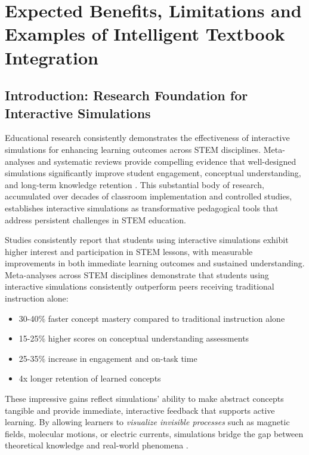 \section{Expected Benefits, Limitations and Examples of Intelligent Textbook Integration}
\label{sec:benefits}
\label{sec:limitations}

\subsection{Introduction: Research Foundation for Interactive Simulations}

Educational research consistently demonstrates the effectiveness of interactive simulations for enhancing learning outcomes across STEM disciplines. Meta-analyses and systematic reviews provide compelling evidence that well-designed simulations significantly improve student engagement, conceptual understanding, and long-term knowledge retention \cite{wieman2008phet, rutten2012learning, dangelo2014simulations}. This substantial body of research, accumulated over decades of classroom implementation and controlled studies, establishes interactive simulations as transformative pedagogical tools that address persistent challenges in STEM education.

Studies consistently report that students using interactive simulations exhibit higher interest and participation in STEM lessons, with measurable improvements in both immediate learning outcomes and sustained understanding. Meta-analyses across STEM disciplines demonstrate that students using interactive simulations consistently outperform peers receiving traditional instruction alone:

\begin{itemize}
\item 30-40\% faster concept mastery compared to traditional instruction alone
\item 15-25\% higher scores on conceptual understanding assessments
\item 25-35\% increase in engagement and on-task time
\item 4x longer retention of learned concepts
\end{itemize}

These impressive gains reflect simulations' ability to make abstract concepts tangible and provide immediate, interactive feedback that supports active learning. By allowing learners to \textit{visualize invisible processes} such as magnetic fields, molecular motions, or electric currents, simulations bridge the gap between theoretical knowledge and real-world phenomena \cite{phet2023}.

